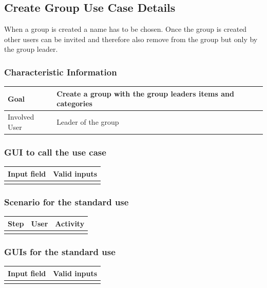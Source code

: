 \documentclass[12pt]{article}
\theoremstyle{definition}
\begin{document}
\subsection{Create Group Use Case Details}

When a group is created a name has to be chosen. Once the group is created other users can be invited and therefore also remove from the group but only by the group leader.

\subsubsection{Characteristic Information}

\begin{tabular}{|l|l|}
\hline
Goal &  Create a group with the group leaders items and categories\\ \hline
Involved User & Leader of the group \\ \hline
\end{tabular}

\subsubsection{GUI to call the use case}

\begin{tabular}{|l|l|}
\hline
Input field & Valid inputs \\ \hline
 &  \\ \hline
\end{tabular}

\subsubsection{Scenario for the standard use}

\begin{tabular}{|l|l|l|}
\hline
Step & User & Activity \\ \hline
 & & \\ \hline
\end{tabular}

\subsubsection{GUIs for the standard use}

\begin{tabular}{|l|l|}
\hline
Input field & Valid inputs \\ \hline
 &  \\ \hline
\end{tabular}
\end{document}
